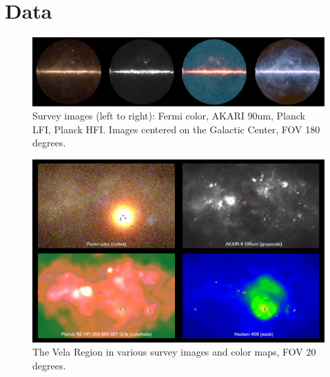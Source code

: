 \renewcommand{\thefootnote}{\arabic{footnote}}

\section{Data}

%
%
%
%
%
%
%
%
%
%
%
%


\begin{figure}[tb]
  \centerline{\includegraphics[width=\textwidth]{figures/four_images}}
  \caption{Survey images (left to right): Fermi color, AKARI 90um, Planck LFI, Planck HFI.
           Images centered on the Galactic Center, FOV 180 degrees.}
  \label{tab:images}
\end{figure}

\begin{figure}[tb]
  \centerline{\includegraphics[width=\textwidth]{figures/vela_region}}
  \caption{The Vela Region in various survey images and color maps, FOV 20 degrees.}
\end{figure}

